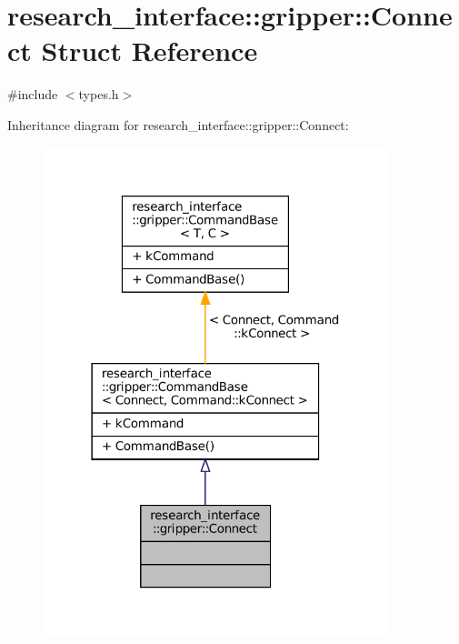 \hypertarget{structresearch__interface_1_1gripper_1_1Connect}{}\section{research\+\_\+interface\+:\+:gripper\+:\+:Connect Struct Reference}
\label{structresearch__interface_1_1gripper_1_1Connect}


{\ttfamily \#include $<$types.\+h$>$}



Inheritance diagram for research\+\_\+interface\+:\+:gripper\+:\+:Connect\+:
\nopagebreak
\begin{figure}[H]
\begin{center}
\leavevmode
\includegraphics[width=285pt]{structresearch__interface_1_1gripper_1_1Connect__inherit__graph}
\end{center}
\end{figure}


